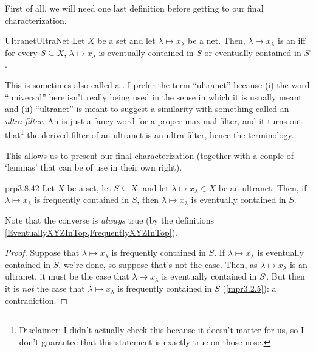 First of all, we will need one last definition before getting to our final characterization.
\begin{dfn}{Ultranet}{UltraNet}
Let $X$ be a set and let $\lambda \mapsto x_{\lambda}$ be a net.  Then, $\lambda \mapsto x_{\lambda}$ is an  iff for every $S\subseteq X$, $\lambda \mapsto x_{\lambda}$ is eventually contained in $S$ or eventually contained in $S^{\comp}$.
\begin{rmk}
This is sometimes also called a .  I prefer the term ``ultranet'' because (i) the word ``universal'' here isn't really being used in the sense in which it is usually meant and (ii) ``ultranet'' is meant to suggest a similarity with something called an \emph{ultra-filter}.  An  is just a fancy word for a proper maximal filter, and it turns out that\footnote{Disclaimer:  I didn't actually check this because it doesn't matter for us, so I don't guarantee that this statement is exactly true on those nose.} the derived filter of an ultranet is an ultra-filter, hence the terminology.
\end{rmk}
\end{dfn}
This allows us to present our final characterization (together with a couple of `lemmas' that can be of use in their own right).
\begin{prp}{}{prp3.8.42}
Let $X$ be a set, let $S\subseteq X$, and let $\lambda \mapsto x_{\lambda}\in X$ be an ultranet.  Then, if $\lambda \mapsto x_{\lambda}$ is frequently contained in $S$, then $\lambda \mapsto x_{\lambda}$ is eventually contained in $S$.
\begin{rmk}
Note that the converse is \emph{always} true (by the definitions \cref{EventuallyXYZInTop,FrequentlyXYZInTop}).
\end{rmk}
\begin{proof}
Suppose that $\lambda \mapsto x_{\lambda}$ is frequently contained in $S$.  If $\lambda \mapsto x_{\lambda}$ is eventually contained in $S$, we're done, so suppose that's not the case.  Then, as $\lambda \mapsto x_{\lambda}$ is an ultranet, it must be the case that $\lambda \mapsto x_{\lambda}$ is eventually contained in $S^{\comp}$.  But then it is \emph{not} the case that $\lambda \mapsto x_{\lambda}$ is frequently contained in $S$ (\cref{mpr3.2.5}):  a contradiction.
\end{proof}
\end{prp}
